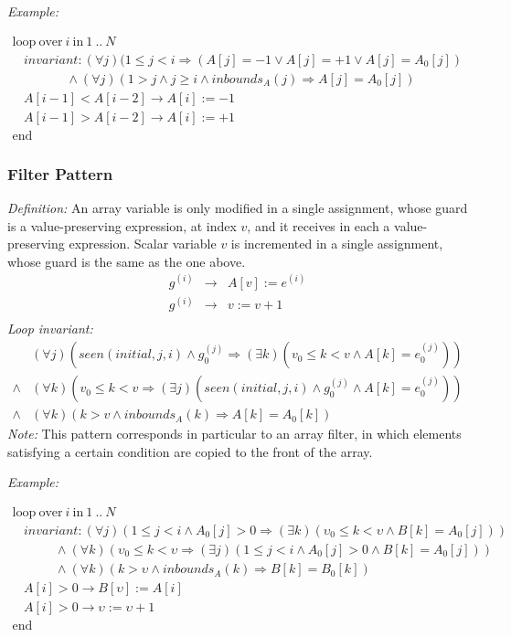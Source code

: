 \documentclass[a4paper,10pt]{article}
\newcommand{\idx}{\ensuremath{i}\xspace}
\newcommand{\idxinitial}{\ensuremath{\mathit{initial}}\xspace}
\newcommand{\at}[1]{{(#1)}}
\newcommand{\KWloop}{\ensuremath{\mathrm{loop}~}}
\newcommand{\KWend}{\ensuremath{\mathrm{end}~}}
\newcommand{\KWover}{\ensuremath{\mathrm{over}~}}
\newcommand{\KWin}{\ensuremath{~\mathrm{in}~}}
\newcommand{\impl}{\ensuremath{\Longrightarrow}}
\newcommand{\inbounds}[2]{\ensuremath{\mathit{inbounds}_{#1}(#2)}\xspace}
\newcommand{\seen}[3]{\ensuremath{\mathit{seen}{(#1,#2,#3)}}\xspace}
\newcommand{\loopinvariant}{\noindent\textit{Loop invariant:}\xspace}
\newcommand{\patterndef}{\noindent\textit{Definition:}\xspace}
\newcommand{\patternexample}{\noindent\textit{Example:}\xspace}
\newcommand{\patternnote}{\noindent\textit{Note:}\xspace}
\begin{document}
\bigskip
\patternexample

\medskip
$\begin{array}{l}
  \KWloop \KWover i \KWin 1~..~N \\
  ~~~~ \textit{invariant}: (\forall j)(1 \leq j < i \impl (A[j] = -1 \lor A[j] = +1 \lor A[j] = A_0[j])\\
  ~~~~~~~~~~~~~~~~~~~ \land (\forall j)(1 > j \land j \geq i \land \inbounds{A}{j}\impl A[j] = A_0[j])\\
  ~~~~ A[i-1] < A[i-2] \rightarrow A[i] := -1\\
  ~~~~ A[i-1] > A[i-2] \rightarrow A[i] := +1\\
  \KWend
\end{array}$

\subsubsection*{Filter Pattern}

\patterndef An array variable is only modified in a single assignment, whose
guard is a value-preserving expression, at index $v$, and it receives in each a 
value-preserving expression. Scalar variable $v$ is incremented in a single assignment, 
whose guard is the same as the one above.
%
\begin{eqnarray*}
g^\at{\idx} &\rightarrow& A[v] := e^\at{\idx}\\
g^\at{\idx} &\rightarrow& v := v + 1\\
\end{eqnarray*}
%
\loopinvariant
%
\begin{eqnarray*}
&(\forall j)(\seen{\idxinitial}{j}{\idx} \land g_0^\at{j} \impl (\exists k)(v_0 \leq k < v \land A[k] = e_0^\at{j}))  \\
\land&
(\forall k)(v_0 \leq k < v \impl (\exists j)(\seen{\idxinitial}{j}{\idx} \land g_0^\at{j} \land A[k] = e_0^\at{j}))  \\
\land&
(\forall k)(k > v \land \inbounds{A}{k} \impl A[k] = A_0[k])
\end{eqnarray*}
%
\patternnote This pattern corresponds in particular to an array filter, in
which elements satisfying a certain condition are copied to the front of the
array.

\bigskip
\patternexample

\medskip
$\begin{array}{l}
  \KWloop \KWover i \KWin 1~..~N \\
  ~~~~ \textit{invariant}: (\forall j)(1 \leq j < i \land A_0[j] > 0 \impl (\exists k)(\upsilon_0 \leq k < \upsilon \land B[k] = A_0[j]))\\
  ~~~~~~~~~~~~~~~ \land (\forall k)(\upsilon_0 \leq k < \upsilon \impl (\exists j)(1 \leq j < i \land  A_0[j] > 0 \land B[k] = A_0[j]))\\
  ~~~~~~~~~~~~~~~ \land (\forall k)(k > \upsilon \land \inbounds{A}{k} \impl B[k] = B_0[k])\\
  ~~~~ A[i] > 0 \rightarrow B[\upsilon] := A[i]\\
  ~~~~ A[i] > 0 \rightarrow \upsilon := \upsilon + 1\\
  \KWend
\end{array}$
\end{document}
